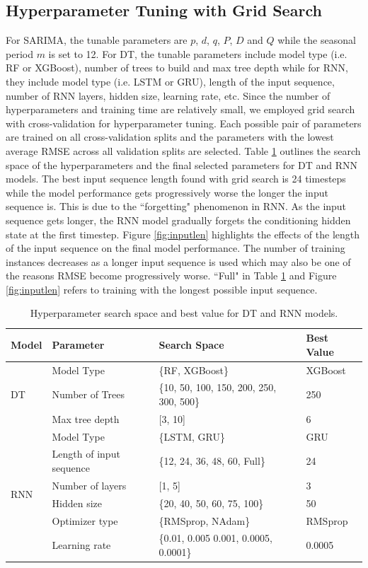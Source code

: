 \documentclass{article}
\begin{document}
\subsection{Hyperparameter Tuning with Grid Search}
\label{appx:params}
For SARIMA, the tunable parameters are $p$, $d$, $q$, $P$, $D$ and $Q$ while the seasonal period $m$ is set to 12. For DT, the tunable parameters include model type (i.e. RF or XGBoost), number of trees to build and max tree depth while for RNN, they include model type (i.e. LSTM or GRU), length of the input sequence, number of RNN layers, hidden size, learning rate, etc. Since the number of hyperparameters and training time are relatively small, we employed grid search with cross-validation for hyperparameter tuning. Each possible pair of parameters are trained on all cross-validation splits and the parameters with the lowest average RMSE across all validation splits are selected. Table \ref{table:params} outlines the search space of the hyperparameters and the final selected parameters for DT and RNN models. The best input sequence length found with grid search is 24 timesteps while the model performance gets progressively worse the longer the input sequence is. This is due to the ``forgetting" phenomenon in RNN. As the input sequence gets longer, the RNN model gradually forgets the conditioning hidden state at the first timestep. Figure \ref{fig:inputlen} highlights the effects of the length of the input sequence on the final model performance. The number of training instances decreases as a longer input sequence is used which may also be one of the reasons RMSE become progressively worse. ``Full" in Table \ref{table:params} and Figure \ref{fig:inputlen} refers to training with the longest possible input sequence. 

\begin{table}[htbp]
    \centering
        \begin{tabular}{l|l|l|l}
            Model & Parameter & Search Space & Best Value \\
            \hline
            \multirow{3}{*}{DT} & Model Type & \{RF, XGBoost\} & XGBoost \\
                    & Number of Trees & \{10, 50, 100, 150, 200, 250, 300, 500\} & 250 \\
                    & Max tree depth & [3, 10] & 6 \\
            \hline
            \multirow{6}{*}{RNN} & Model Type & \{LSTM, GRU\} & GRU \\
                    & Length of input sequence & \{12, 24, 36, 48, 60, Full\} & 24 \\
                    & Number of layers & [1, 5] & 3 \\
                    & Hidden size & \{20, 40, 50, 60, 75, 100\} & 50 \\
                    & Optimizer type & \{RMSprop, NAdam\} & RMSprop \\
                    & Learning rate & \{0.01, 0.005 0.001, 0.0005, 0.0001\} & 0.0005 \\
        \end{tabular}
    \caption{Hyperparameter search space and best value for DT and RNN models.}
    \label{table:params}
\end{table}
\end{document}
